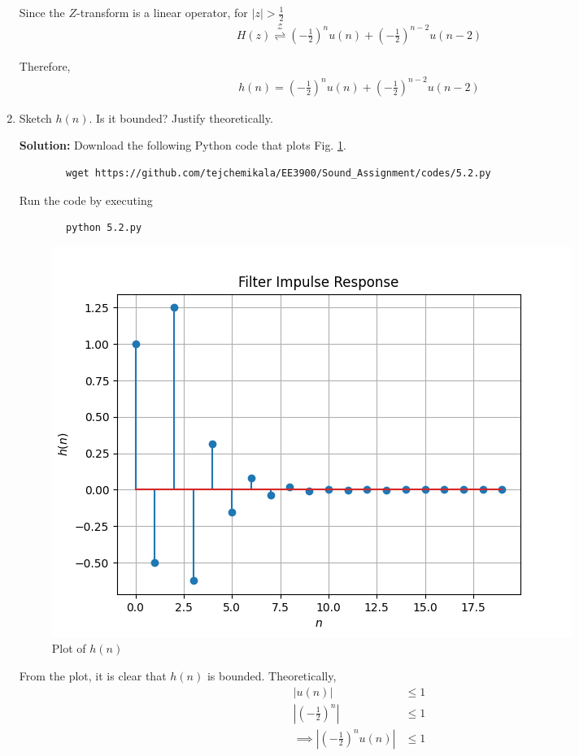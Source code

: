 \documentclass[journal,12pt,twocolumn]{IEEEtran}
\newcommand{\solution}{\noindent \textbf{Solution: }}
\providecommand{\brak}[1]{\ensuremath{\left(#1\right)}}
\providecommand{\abs}[1]{\left\vert#1\right\vert}
\providecommand{\ztrans}{\overset{\mathcal{Z}}{ \rightleftharpoons}}
\numberwithin{equation}{section}
\renewcommand\thesection{\arabic{section}}
\begin{document}
\begin{enumerate}[label=\thesection.\arabic*]
	Since the $Z$-transform is a linear operator, for $\abs{z} > \frac12$
	\begin{align}
		H(z) \ztrans \brak{-\frac12}^n u(n) + \brak{-\frac12}^{n-2} u(n-2)
	\end{align}
	
	Therefore, 
	\begin{align}
		h(n) = \brak{-\frac12}^n u(n) + \brak{-\frac12}^{n-2} u(n-2)
	\end{align}
	
	\item Sketch $h(n)$. Is it bounded? Justify theoretically.
	
	\solution Download the following Python code that plots Fig. \ref{fig-5.2}.
	\begin{lstlisting}
		wget https://github.com/tejchemikala/EE3900/Sound_Assignment/codes/5.2.py
	\end{lstlisting}
	
	Run the code by executing
	\begin{lstlisting}
		python 5.2.py
	\end{lstlisting}

	\begin{figure}[!ht]
		\centering
		\includegraphics[width=\columnwidth]{./figs/5.2.png}
		\caption{Plot of $h(n)$}
		\label{fig-5.2}	
	\end{figure} 
	
	From the plot, it is clear that $h(n)$ is bounded. Theoretically,
	\begin{align}
		\abs{u(n)} &\le 1 \\
		\abs{\brak{-\frac12}^n} &\le 1 \\
		\implies \abs{\brak{-\frac12}^n u(n)} &\le 1
	\end{align}
	

\end{enumerate}
\end{document}
